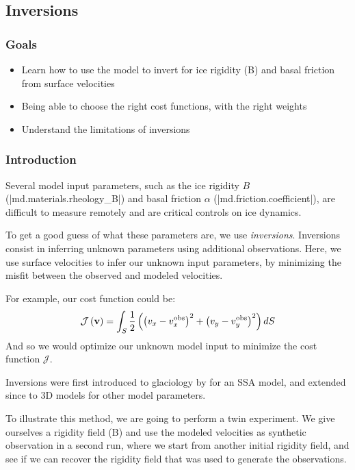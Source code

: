 
\subsection{Inversions} \label{sec:using-issm-tutorials-inversions}
\subsubsection{Goals} %
\begin{itemize}
	\item Learn how to use the model to invert for ice rigidity (B) and basal friction from surface velocities
	\item Being able to choose the right cost functions, with the right weights
	\item Understand the limitations of inversions
\end{itemize}

\subsubsection{Introduction}%
Several model input parameters, such as the ice rigidity $B$ (\lstinlinebg|md.materials.rheology_B|) and basal friction $\alpha$ (\lstinlinebg|md.friction.coefficient|), are difficult to measure remotely and are critical controls on ice dynamics.

To get a good guess of what these parameters are, we use \emph{inversions}. Inversions consist in inferring unknown parameters using additional observations. Here, we use surface velocities to infer our unknown input parameters, by minimizing the misfit between the observed and modeled velocities.

For example, our cost function could be:
\begin{equation}
	{\mathcal J\left({\bf v}\right)}
	=\int_{S} \dfrac{1}{2}\left(
	\left(v_x-v_x^{\text{obs}}\right)^{2}
	+\left(v_y-v_y^{\text{obs}}\right)^{2}
	\right) dS
\end{equation}
And so we would optimize our unknown model input to minimize the cost function ${\mathcal J}$.

Inversions were first introduced to glaciology by \cite{MacAyeal1993a} for an SSA model, and extended since to 3D models for other model parameters.

To illustrate this method, we are going to perform a twin experiment. We give ourselves a rigidity field (B) and use the modeled velocities as synthetic observation in a second run, where we start from another initial rigidity field, and see if we can recover the rigidity field that was used to generate the observations.
